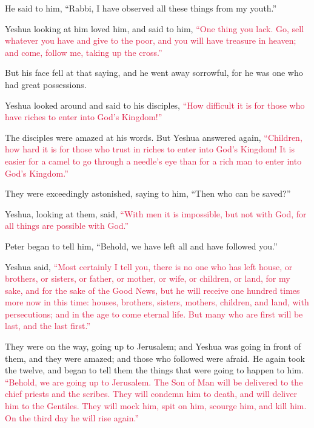 \myverse{}He said to him, “Rabbi, I have observed all these things from
my youth.”

\myverse{}Yeshua looking at him loved him, and said to him,
\textcolor{crimson}{“One thing you lack. Go, sell whatever you have and give to the poor, and you will have treasure in
	heaven; and come, follow me, taking up the cross.”}

\myverse{}But his face fell at that saying, and he went away sorrowful,
for he was one who had great possessions.

\myverse{}Yeshua looked around and said to his disciples,
\textcolor{crimson}{“How difficult it is for those who have riches to enter into God’s Kingdom!”}

\myverse{}The disciples were amazed at his words. But Yeshua answered
again,
\textcolor{crimson}{“Children, how hard it is for those who trust in riches to enter into God’s Kingdom!
}
\myverse{}\textcolor{crimson}{It is easier for a camel to go through a needle’s eye than for a rich
	man to enter into God’s Kingdom.”}

\myverse{}They were exceedingly astonished, saying to him, “Then who can
be saved?”

\myverse{}Yeshua, looking at them, said,
\textcolor{crimson}{“With men it is impossible, but not with God, for all things are possible with God.”}

\myverse{}Peter began to tell him, “Behold, we have left all and have
followed you.”

\myverse{}Yeshua said,
\textcolor{crimson}{“Most certainly I tell you, there is no one who has left house, or brothers, or sisters, or father,
	or mother, or wife, or children, or land, for my sake, and for the sake of the Good News,
}
\myverse{}\textcolor{crimson}{but he will receive one hundred times more now in this time: houses,
	brothers, sisters, mothers, children, and land, with persecutions; and in the age to come eternal life.
}
\myverse{}\textcolor{crimson}{But many who are first will be last, and the last first.”}

\myverse{}They were on the way, going up to Jerusalem; and Yeshua was
going in front of them, and they were amazed; and those who followed were afraid. He again took the twelve,
and began to tell them the things that were going to happen to him.
\myverse{}\textcolor{crimson}{“Behold, we are going up to Jerusalem. The Son of Man will be delivered
	to the chief priests and the scribes. They will condemn him to death, and will deliver him to the Gentiles.
}
\myverse{}\textcolor{crimson}{They will mock him, spit on him, scourge him, and kill him. On the third
	day he will rise again.”}

